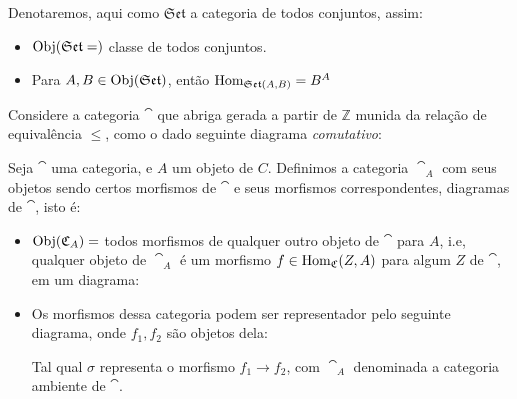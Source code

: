 \documentclass[../main]{subfiles}
\begin{document}
\begin{example}
    Denotaremos, aqui como \(\mathfrak{Set}\) a categoria de todos conjuntos,
    assim: 
    \begin{itemize}
        \item \(\text{Obj}(\mathfrak{Set} = )\) classe de todos conjuntos.
        \item Para \(A, B \in \text{Obj}(\mathfrak{Set})\), então
        \(\text{Hom}_{\mathfrak{Set}(A, B)} = B^A\)
    \end{itemize}
\end{example}
\begin{example}
    Considere a categoria \(\cat\) que abriga gerada a partir de \(\mathbb Z\)
    munida da relação de equivalência \(\leq\), como o dado seguinte diagrama
    \textit{comutativo}:

    \begin{center}    
    \end{center}
\end{example}
\begin{example}
    Seja \(\cat\) uma categoria, e \(A\) um objeto de \(C\). Definimos a
    categoria \(\cat_A\) com seus objetos sendo certos morfismos de \(\cat\) e
    seus morfismos correspondentes, diagramas de \(\cat\), isto é:
    \begin{itemize}
        \item \(\text{Obj} (\mathfrak{C}_A) =\) todos morfismos de qualquer outro objeto de
        \(\cat\) para \(A\), i.e, qualquer objeto de \(\cat_A\) é um morfismo
        \(f \in \text{Hom}_{\mathfrak{C}}(Z, A)\) para algum \(Z\) de \(\cat\), em um diagrama:
        \begin{center}
        \end{center}
        \item Os morfismos dessa categoria podem ser representador pelo seguinte
        diagrama, onde \(f_1, f_2\) são objetos dela:
        \begin{center}
        \end{center}

        Tal qual \(\sigma\) representa o morfismo \(f_1 \to f_2\), com
        \(\cat_A\) denominada a categoria ambiente de \(\cat\).
    \end{itemize}
\end{example}
\end{document}
